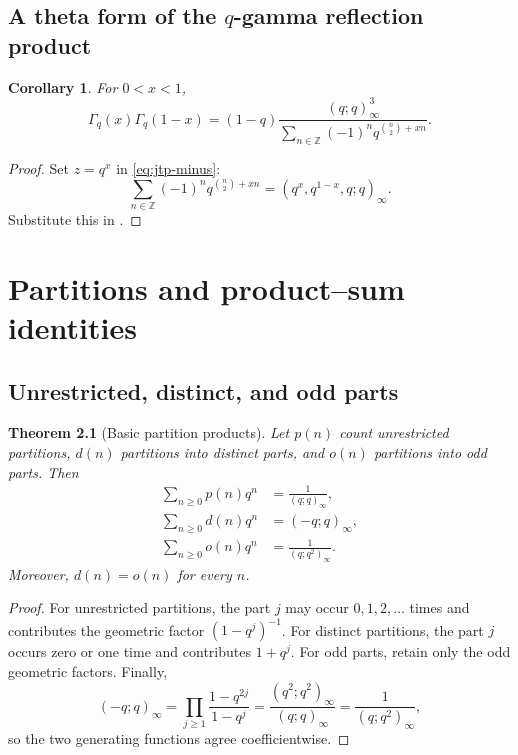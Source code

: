\documentclass[11pt,oneside,openany]{book}
\newtheorem{theorem}{Theorem}[chapter]
\newtheorem{corollary}[corollary]{Corollary}
\theoremstyle{definition}
\theoremstyle{remark}
\newcommand{\Z}{\mathbb Z}
\begin{document}
\section{A theta form of the \texorpdfstring{$q$}{q}-gamma reflection product}

\begin{corollary}\label{cor:qgamma-theta}
For $0<x<1$,
\[
 \Gamma_q(x)\Gamma_q(1-x)
 =(1-q)\frac{(q;q)_\infty^3}
 {\displaystyle\sum_{n\in\Z}(-1)^n
 q^{\binom n2+xn}}.
\]
\end{corollary}

\begin{proof}
Set $z=q^x$ in \eqref{eq:jtp-minus}:
\[
 \sum_{n\in\Z}(-1)^nq^{\binom n2+xn}
 =(q^x,q^{1-x},q;q)_\infty.
\]
Substitute this in .
\end{proof}

\chapter{Partitions and product--sum identities}\label{chap:partitions}

\section{Unrestricted, distinct, and odd parts}

\begin{theorem}[Basic partition products]\label{thm:partition-products}
Let $p(n)$ count unrestricted partitions, $d(n)$ partitions into distinct parts, and $o(n)$ partitions into odd parts.  Then
\begin{align*}
 \sum_{n\ge0}p(n)q^n&=\frac1{(q;q)_\infty},\\
 \sum_{n\ge0}d(n)q^n&=(-q;q)_\infty,\\
 \sum_{n\ge0}o(n)q^n&=\frac1{(q;q^2)_\infty}.
\end{align*}
Moreover, $d(n)=o(n)$ for every $n$.
\end{theorem}

\begin{proof}
For unrestricted partitions, the part $j$ may occur $0,1,2,\dots$ times and contributes the geometric factor $(1-q^j)^{-1}$.  For distinct partitions, the part $j$ occurs zero or one time and contributes $1+q^j$.  For odd parts, retain only the odd geometric factors.  Finally,
\[
 (-q;q)_\infty
 =\prod_{j\ge1}\frac{1-q^{2j}}{1-q^j}
 =\frac{(q^2;q^2)_\infty}{(q;q)_\infty}
 =\frac1{(q;q^2)_\infty},
\]
so the two generating functions agree coefficientwise.
\end{proof}
\end{document}
